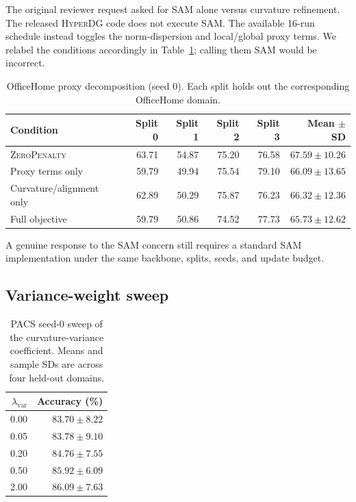 \documentclass[10pt]{article}
\newcommand{\method}{\textsc{HyperDG}}
\newcommand{\control}{\textsc{ZeroPenalty}}
\begin{document}
The original reviewer request asked for SAM alone versus curvature refinement.
The released \method{} code does not execute SAM. The available 16-run schedule
instead toggles the norm-dispersion and local/global proxy terms. We relabel the
conditions accordingly in Table~\ref{tab:proxy}; calling them SAM would be
incorrect.

\begin{table}[H]
\centering
\caption{OfficeHome proxy decomposition (seed 0). Each split holds out the
corresponding OfficeHome domain.}
\label{tab:proxy}
\begin{tabular}{lrrrrr}
\toprule
Condition & Split 0 & Split 1 & Split 2 & Split 3 & Mean $\pm$ SD \\
\midrule
\control{}                 & 63.71 & 54.87 & 75.20 & 76.58 & $67.59\pm10.26$ \\
Proxy terms only         & 59.79 & 49.94 & 75.54 & 79.10 & $66.09\pm13.65$ \\
Curvature/alignment only & 62.89 & 50.29 & 75.87 & 76.23 & $66.32\pm12.36$ \\
Full objective           & 59.79 & 50.86 & 74.52 & 77.73 & $65.73\pm12.62$ \\
\bottomrule
\end{tabular}
\end{table}

A genuine response to the SAM concern still requires a standard SAM
implementation under the same backbone, splits, seeds, and update budget.

\subsection{Variance-weight sweep}

\begin{table}[H]
\centering
\caption{PACS seed-0 sweep of the curvature-variance coefficient. Means and
sample SDs are across four held-out domains.}
\label{tab:variance-sweep}
\begin{tabular}{rr}
\toprule
$\lambda_{\mathrm{var}}$ & Accuracy (\%) \\
\midrule
0.00 & $83.70\pm8.22$ \\
0.05 & $83.78\pm9.10$ \\
0.20 & $84.76\pm7.55$ \\
0.50 & $85.92\pm6.09$ \\
2.00 & $86.09\pm7.63$ \\
\bottomrule
\end{tabular}
\end{table}
\end{document}
